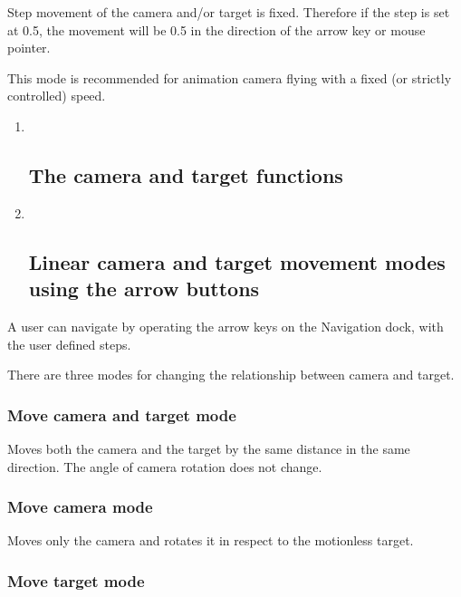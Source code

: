 Step movement of the camera and/or target is fixed. Therefore if the
step is set at 0.5, the movement will be 0.5 in the direction of the
arrow key or mouse pointer.

This mode is recommended for animation camera flying with a fixed (or
strictly controlled) speed.

\begin{enumerate}
\def\labelenumi{\arabic{enumi}.}
\item ~
  \hypertarget{the-camera-and-target-functions}{\subsection{The camera
  and target functions}\label{the-camera-and-target-functions}}
\item ~
  \hypertarget{linear-camera-and-target-movement-modes-using-the-arrow-buttons}{\subsection{Linear
  camera and target movement modes using the arrow
  buttons}\label{linear-camera-and-target-movement-modes-using-the-arrow-buttons}}
\end{enumerate}

A user can navigate by operating the arrow keys on the Navigation dock,
with the user defined steps.

There are three modes for changing the relationship between camera and
target.

\subsubsection{Move camera and target
mode}\label{move-camera-and-target-mode}

Moves both the camera and the target by the same distance in the same
direction. The angle of camera rotation does not change.

\subsubsection{Move camera mode}\label{move-camera-mode}

Moves only the camera and rotates it in respect to the motionless
target.

\subsubsection{Move target mode}\label{move-target-mode}


